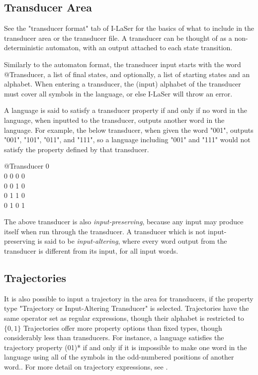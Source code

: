 \documentclass{article}
\begin{document}
\subsection{Transducer Area}
See the "transducer format" tab of I-LaSer for the basics of what to include in the transducer area or the transducer file.
A transducer can be thought of as a non-deterministic automaton, with an output attached to each state transition.

Similarly to the automaton format, the transducer input starts with the word @Transducer, a list of final states, and optionally, a list of starting states and an alphabet.
When entering a transducer, the (input) alphabet of the transducer must cover all symbols in the language, or else I-LaSer will throw an error.

A language is said to satisfy a transducer property if and only if no word in the language, when inputted to the transducer, outputs another word in the language. 
For example, the below transducer, when given the word "001", outputs "001", "101", "011", and "111", so a language including "001" and "111" would not satisfy the property defined by that transducer.
\begin{center}
@Transducer 0\\
0 0 0 0\\
0 0 1 0\\
0 1 1 0\\
0 1 0 1\\
\end{center}
The above transducer is also \textit{input-preserving}, because any input may produce itself when run through the transducer. 
A transducer which is not input-preserving is said to be \textit{input-altering}, where every word output from the transducer is different from its input, for all input words.

\subsection{Trajectories}
It is also possible to input a trajectory in the area for transducers, if the property type "Trajectory or Input-Altering Transducer" is selected.
Trajectories have the same operator set as regular expressions, %
though their alphabet is restricted to $\{0, 1\}$
Trajectories offer more property options than fixed types, though considerably less than transducers.
For instance, a language satisfies the trajectory property (01)* if and only if it is impossible to make one word in the language using all of the symbols in the odd-numbered positions of another word..
For more detail on trajectory expressions, see \cite{traj}.
\end{document}
